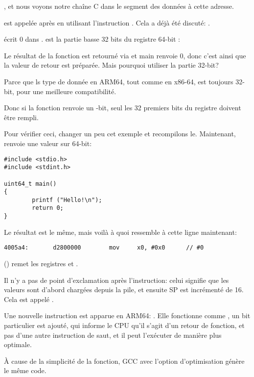 , et nous voyons notre chaîne C  dans le  segment
des données à cette adresse.


\puts est appelée après en utilisant l'instruction . Cela a déjà été discuté: .

\MOV écrit 0 dans .
 est la partie basse 32 bits du registre 64-bit :



Le résultat de la fonction est retourné via  et main renvoie 0, donc c'est ainsi que la valeur
de retour est préparée.
Mais pourquoi utiliser la partie 32-bit?

Parce que ls type de donnée \Tint en ARM64, tout comme en x86-64, est toujours 32-bit, pour une
meilleure compatibilité.

Donc si la fonction renvoie un -bit, seul les 32 premiers bits du registre  doivent
être rempli.

Pour vérifier ceci, changer un peu cet exemple et recompilons le.
Maintenant, \main renvoie une valeur sur 64-bit:

\begin{lstlisting}[caption=\main renvoie une valeur de type \TT{uint64\_t} type,style=customc]
#include <stdio.h>
#include <stdint.h>

uint64_t main()
{
        printf ("Hello!\n");
        return 0;
}
\end{lstlisting}

Le résultat est le même, mais voilà à quoi ressemble \MOV à cette ligne maintenant:

\begin{lstlisting}[caption=GCC 4.8.1 \NonOptimizing + objdump]
  4005a4:       d2800000        mov     x0, #0x0      // #0
\end{lstlisting}


 () remet les registres  et .

Il n'y a pas de point d'exclamation après l'instruction: celui signifie que les valeurs sont
d'abord chargées depuis la pile, et ensuite \ac{SP} est incrémenté de 16.
Cela est appelé .

Une nouvelle instruction est apparue en ARM64: \RET.
Elle fonctionne comme , un  bit particulier est ajouté, qui informe le \ac{CPU}
qu'il s'agit d'un retour de fonction, et pas d'une autre instruction de saut, et il peut l'exécuter
de manière plus optimale. 

À cause de la simplicité de la fonction, GCC avec l'option d'optimisation génère le même code.
